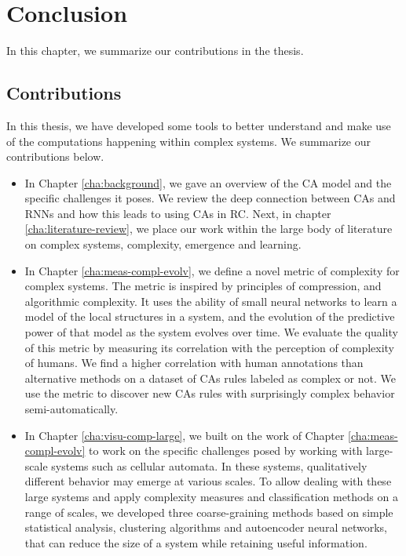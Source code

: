 \chapter{Conclusion}

In this chapter, we summarize our contributions in the thesis.
%
\section{Contributions}

In this thesis, we have developed some tools to better understand and make use
of the computations happening within complex systems.
We summarize our contributions below.

\begin{itemize}
  \item In Chapter \ref{cha:background}, we gave an overview of the \acf{CA}
        model and the specific challenges it poses. We review the deep
        connection between \acp{CA} and \acfp{RNN} and how this leads to using
        \acp{CA} in \acf{RC}. Next, in chapter \ref{cha:literature-review}, we
        place our work within the large body of literature on complex systems,
        complexity, emergence and learning.

  \item In Chapter \ref{cha:meas-compl-evolv}, we define a novel metric of
        complexity for complex systems. The metric is inspired by principles of
        compression, and algorithmic complexity. It uses the ability of small
        neural networks to learn a model of the local structures in a system,
        and the evolution of the predictive power of that model as the system
        evolves over time. We evaluate the quality of this metric by measuring
        its correlation with the perception of complexity of humans. We find a
        higher correlation with human annotations than alternative methods on a
        dataset of \acp{CA} rules labeled as complex or not. We use the metric
        to discover new \acp{CA} rules with surprisingly complex behavior
        semi-automatically.

  \item In Chapter \ref{cha:visu-comp-large}, we built on the work of Chapter
        \ref{cha:meas-compl-evolv} to work on the specific challenges posed by
        working with large-scale systems such as cellular automata. In these
        systems, qualitatively different behavior may emerge at various scales.
        To allow dealing with these large systems and apply complexity measures
        and classification methods on a range of scales, we developed three
        coarse-graining methods based on simple statistical analysis, clustering
        algorithms and autoencoder neural networks, that can reduce the size of
        a system while retaining useful information.


\end{itemize}
